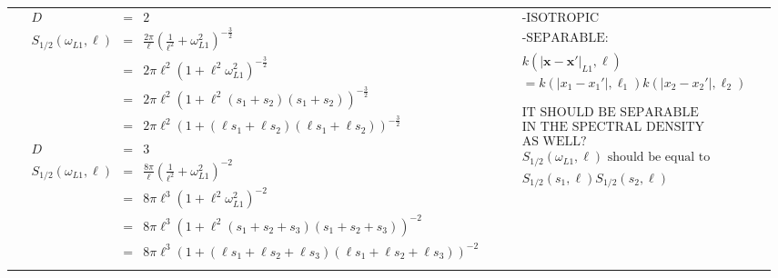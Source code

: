 \documentclass[]{interact}
\theoremstyle{plain}%
\theoremstyle{definition}
\theoremstyle{remark}
\begin{document}
\begin{landscape}
\begin{table}[H]
\begin{center}
\begin{tabular}{|c|c|c|c|}
       & \multicolumn{1}{|p{9.7cm}|}{\small
         \begin{eqnarray*}
		D &=& 2\\
		S_{1/2}(\omega_{L1},\ell) &=& \frac{2\pi}{\ell}\left(\frac{1}{\ell^2}+\omega_{L1}^2 \right)^{-\frac{3}{2}} \\
		&=& 2\pi\ell^2\left(1+\ell^2\omega_{L1}^2\right)^{-\frac{3}{2}} \\
		&=& 2\pi\ell^2\left(1+\ell^2(s_{1}+s_{2})(s_{1}+s_{2})\right)^{-\frac{3}{2}} \\
		&=& 2\pi\ell^2\left(1+(\ell s_{1}+\ell s_{2})(\ell s_{1}+\ell s_{2})\right)^{-\frac{3}{2}} \\
		\\
		D &=& 3\\
		S_{1/2}(\omega_{L1},\ell) &=& \frac{8\pi}{\ell}\left(\frac{1}{\ell^2}+\omega_{L1}^2 \right)^{-2} \\
		&=& 8\pi\ell^3\left(1+\ell^2\omega_{L1}^2\right)^{-2} \\
		&=& 8\pi\ell^3\left(1+\ell^2(s_{1}+s_{2}+s_{3})(s_{1}+s_{2}+s_{3})\right)^{-2} \\
		&=& 8\pi\ell^3\left(1+(\ell s_{1}+\ell s_{2}+\ell s_{3})(\ell s_{1}+\ell s_{2}+\ell s_{3})\right)^{-2} 
         \end{eqnarray*}
       }
       
       & \multicolumn{1}{|p{5.7cm}|}{\small
         \begin{eqnarray*}
        &&\text{-ISOTROPIC}\\
        \\
		&&\text{-SEPARABLE:} \\
		\\
		&&k(|\bm{x}-\bm{x}'|_{L1},\bm{\ell})\\
		 &&= k(|x_1-x_1'|,\ell_1)k(|x_2-x_2'|,\ell_2)\\
		 \\
		 \\
		 &&\text{IT SHOULD BE SEPARABLE}\\
		 &&\text{IN THE SPECTRAL DENSITY} \\
		 &&\text{AS WELL?}\\
		&&S_{1/2}(\omega_{L1},\ell) \text{ should be equal to }\\
		 &&S_{1/2}(s_1,\ell)S_{1/2}(s_2,\ell)
         \end{eqnarray*}
       }\\
       \vspace{-10mm}\\
        \cline{1-3}
         

\end{tabular}
\end{center}
\end{table}
\end{landscape}
\end{document}
